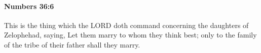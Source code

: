 
		\paragraph{Numbers 36:6} %
			\label{NUMBERS-36-6}

			This is the thing which the LORD doth command concerning the daughters of Zelophehad, saying, Let them marry to whom they think best; only to the family of the tribe of their father shall they marry.



